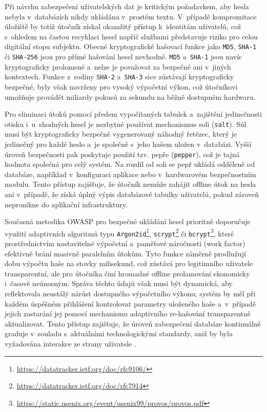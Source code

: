 Při návrhu zabezpečení uživatelských dat je kritickým požadavkem, aby hesla nebyla v~databázích nikdy ukládána v~prostém textu.
V~případě kompromitace úložiště by totiž útočník získal okamžitý přístup k~identitám uživatelů, což s~ohledem na častou recyklaci hesel napříč službami představuje riziko pro celou digitální stopu subjektu.
Obecné kryptografické hašovací funkce jako \texttt{MD5}, \texttt{SHA-1} či \texttt{SHA-256} jsou pro přímé hašování hesel nevhodné.
\texttt{MD5} a~\texttt{SHA-1} jsou navíc kryptograficky prolomené a~nelze je považovat za bezpečné ani v~jiných kontextech.
Funkce z~rodiny \texttt{SHA-2} a~\texttt{SHA-3} sice zůstávají kryptograficky bezpečné, byly však navrženy pro vysoký výpočetní výkon, což útočníkovi umožňuje provádět miliardy pokusů za sekundu na běžně dostupném hardwaru.

Pro eliminaci útoků pomocí předem vypočítaných tabulek a~zajištění jedinečnosti otisku i~u~shodných hesel je nezbytné používat mechanismus soli (\texttt{salt}).
Sůl musí být kryptograficky bezpečně vygenerovaný náhodný řetězec, který je jedinečný pro každé heslo a~je společně s~jeho hašem uložen v~databázi.
Vyšší úroveň bezpečnosti pak poskytuje použití tzv. pepře (\texttt{pepper}), což je tajná hodnota společná pro celý systém.
Na rozdíl od soli se pepř ukládá odděleně od databáze, například v~konfiguraci aplikace nebo v~hardwarovém bezpečnostním modulu.
Tento přístup zajišťuje, že útočník nemůže zahájit offline útok na hesla ani v~případě, že získá úplný výpis databázové tabulky uživatelů, pokud zároveň nepronikne do aplikační infrastruktury.

Současná metodika OWASP pro bezpečné ukládání hesel prioritně doporučuje využití adaptivních algoritmů typu \texttt{Argon2id}\footnote{\url{https://datatracker.ietf.org/doc/rfc9106/}}, \texttt{scrypt}\footnote{\url{https://datatracker.ietf.org/doc/rfc7914}} či \texttt{bcrypt}\footnote{\url{https://static.usenix.org/event/usenix99/provos/provos.pdf}}, které prostřednictvím nastavitelné výpočetní a~paměťové náročnosti (work factor) efektivně brání masivně paralelním útokům.
Tyto funkce záměrně prodlužují dobu výpočtu haše na stovky milisekund, což zůstává pro legitimního uživatele transparentní, ale pro útočníka činí hromadné offline prolamování ekonomicky i~časově neúnosným.
Správa těchto údajů však musí být dynamická, aby reflektovala neustálý nárůst dostupného výpočetního výkonu; systém by měl při každém úspěšném přihlášení kontrolovat parametry uloženého haše a~v~případě jejich zastarání jej pomocí mechanismu adaptivního re-hašování transparentně aktualizovat.
Tento přístup zajišťuje, že úroveň zabezpečení databáze kontinuálně graduje v~souladu s~aktuálními technologickými standardy, aniž by byla vyžadována interakce ze strany uživatele \cite{www-owasp-password}.

